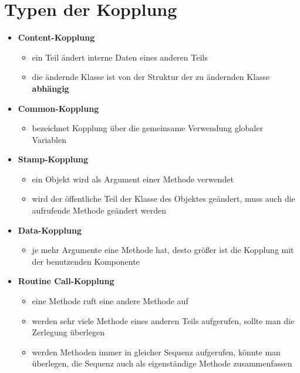 \section{Typen der Kopplung}


\begin{tcolorbox}[title=Typen der Kopplung]
    \begin{itemize}
        \item \textbf{Content-Kopplung}
        \begin{itemize}
            \item ein Teil ändert interne Daten eines anderen Teils
            \item die ändernde Klasse ist von der Struktur der zu ändernden Klasse \textbf{abhängig}
        \end{itemize}
        \item \textbf{Common-Kopplung}
        \begin{itemize}
            \item bezeichnet Kopplung über die gemeinsame Verwendung globaler Variablen
        \end{itemize}
        \item \textbf{Stamp-Kopplung}
        \begin{itemize}
            \item ein Objekt wird als Argument einer Methode verwendet
            \item wird der öffentliche Teil der Klasse des Objektes geändert, muss auch die aufrufende Methode geändert werden
        \end{itemize}
        \item \textbf{Data-Kopplung}
        \begin{itemize}
            \item je mehr Argumente eine Methode hat, desto größer ist die Kopplung mit der benutzenden Komponente
        \end{itemize}
        \item \textbf{Routine Call-Kopplung}
        \begin{itemize}
            \item eine Methode ruft eine andere Methode auf
            \item werden sehr viele Methode eines anderen Teils aufgerufen, sollte man die Zerlegung überlegen
            \item werden Methoden immer in gleicher Sequenz aufgerufen, könnte man überlegen, die Sequenz auch als eigenständige Methode zusammenfassen
        \end{itemize}
    \end{itemize}
\end{tcolorbox}
